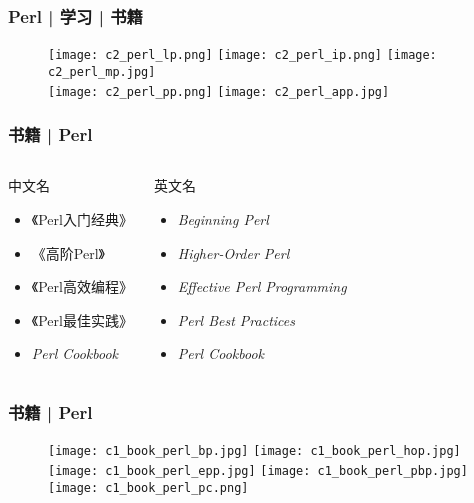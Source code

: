 \begin{frame}
  \frametitle{Perl | 学习 | 书籍}
  \begin{figure}
    \centering
    \texttt{[image: c2\_perl\_lp.png]}
    \qquad
    \texttt{[image: c2\_perl\_ip.png]}
    \qquad
    \texttt{[image: c2\_perl\_mp.jpg]}\\
    \texttt{[image: c2\_perl\_pp.png]}
    \hspace{2cm}
    \texttt{[image: c2\_perl\_app.jpg]}
  \end{figure}
\end{frame}

\begin{frame}
  \frametitle{书籍 | Perl}
  \begin{columns}
  \begin{block}{中文名}
    \begin{itemize}
      \item 《Perl入门经典》
      \item 《高阶Perl》
      \item 《Perl高效编程》
      \item 《Perl最佳实践》
      \item \textit{Perl Cookbook}
    \end{itemize}
  \end{block}
  \begin{block}{英文名}
    \begin{itemize}
      \item \textit{Beginning Perl}
      \item \textit{Higher-Order Perl}
      \item \textit{Effective Perl Programming}
      \item \textit{Perl Best Practices}
      \item \textit{Perl Cookbook}
    \end{itemize}
  \end{block}
\end{columns}
\end{frame}

\begin{frame}
  \frametitle{书籍 | Perl}
  \begin{figure}
    \centering
    \texttt{[image: c1\_book\_perl\_bp.jpg]}\qquad
    \texttt{[image: c1\_book\_perl\_hop.jpg]}\\
    \texttt{[image: c1\_book\_perl\_epp.jpg]}\quad
    \texttt{[image: c1\_book\_perl\_pbp.jpg]}\quad
    \texttt{[image: c1\_book\_perl\_pc.png]}
  \end{figure}
\end{frame}

